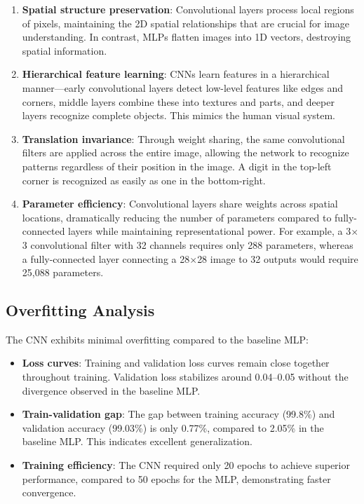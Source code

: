 \begin{enumerate}
    \item \textbf{Spatial structure preservation}: Convolutional layers process local regions of pixels, maintaining the 2D spatial relationships that are crucial for image understanding. In contrast, MLPs flatten images into 1D vectors, destroying spatial information.
    
    \item \textbf{Hierarchical feature learning}: CNNs learn features in a hierarchical manner---early convolutional layers detect low-level features like edges and corners, middle layers combine these into textures and parts, and deeper layers recognize complete objects. This mimics the human visual system.
    
    \item \textbf{Translation invariance}: Through weight sharing, the same convolutional filters are applied across the entire image, allowing the network to recognize patterns regardless of their position in the image. A digit in the top-left corner is recognized as easily as one in the bottom-right.
    
    \item \textbf{Parameter efficiency}: Convolutional layers share weights across spatial locations, dramatically reducing the number of parameters compared to fully-connected layers while maintaining representational power. For example, a 3$\times$3 convolutional filter with 32 channels requires only 288 parameters, whereas a fully-connected layer connecting a 28$\times$28 image to 32 outputs would require 25,088 parameters.
\end{enumerate}

\subsection{Overfitting Analysis}

The CNN exhibits minimal overfitting compared to the baseline MLP:

\begin{itemize}
    \item \textbf{Loss curves}: Training and validation loss curves remain close together throughout training. Validation loss stabilizes around 0.04--0.05 without the divergence observed in the baseline MLP.
    
    \item \textbf{Train-validation gap}: The gap between training accuracy (99.8\%) and validation accuracy (99.03\%) is only 0.77\%, compared to 2.05\% in the baseline MLP. This indicates excellent generalization.
    
    \item \textbf{Training efficiency}: The CNN required only 20 epochs to achieve superior performance, compared to 50 epochs for the MLP, demonstrating faster convergence.
\end{itemize}

